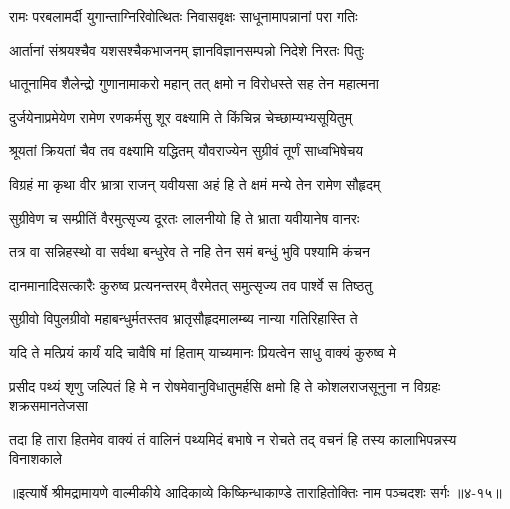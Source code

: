 \twolineshloka
{रामः परबलामर्दी युगान्ताग्निरिवोत्थितः}
{निवासवृक्षः साधूनामापन्नानां परा गतिः} %

\twolineshloka
{आर्तानां संश्रयश्चैव यशसश्चैकभाजनम्}
{ज्ञानविज्ञानसम्पन्नो निदेशे निरतः पितुः} %

\twolineshloka
{धातूनामिव शैलेन्द्रो गुणानामाकरो महान्}
{तत् क्षमो न विरोधस्ते सह तेन महात्मना} %

\twolineshloka
{दुर्जयेनाप्रमेयेण रामेण रणकर्मसु}
{शूर वक्ष्यामि ते किंचिन्न चेच्छाम्यभ्यसूयितुम्} %

\twolineshloka
{श्रूयतां क्रियतां चैव तव वक्ष्यामि यद्धितम्}
{यौवराज्येन सुग्रीवं तूर्णं साध्वभिषेचय} %

\twolineshloka
{विग्रहं मा कृथा वीर भ्रात्रा राजन् यवीयसा}
{अहं हि ते क्षमं मन्ये तेन रामेण सौहृदम्} %

\twolineshloka
{सुग्रीवेण च सम्प्रीतिं वैरमुत्सृज्य दूरतः}
{लालनीयो हि ते भ्राता यवीयानेष वानरः} %

\twolineshloka
{तत्र वा सन्निहस्थो वा सर्वथा बन्धुरेव ते}
{नहि तेन समं बन्धुं भुवि पश्यामि कंचन} %

\twolineshloka
{दानमानादिसत्कारैः कुरुष्व प्रत्यनन्तरम्}
{वैरमेतत् समुत्सृज्य तव पार्श्वे स तिष्ठतु} %

\twolineshloka
{सुग्रीवो विपुलग्रीवो महाबन्धुर्मतस्तव}
{भ्रातृसौहृदमालम्ब्य नान्या गतिरिहास्ति ते} %

\twolineshloka
{यदि ते मत्प्रियं कार्यं यदि चावैषि मां हिताम्}
{याच्यमानः प्रियत्वेन साधु वाक्यं कुरुष्व मे} %

\twolineshloka
{प्रसीद पथ्यं शृणु जल्पितं हि मे न रोषमेवानुविधातुमर्हसि}
{क्षमो हि ते कोशलराजसूनुना न विग्रहः शक्रसमानतेजसा} %

\twolineshloka
{तदा हि तारा हितमेव वाक्यं तं वालिनं पथ्यमिदं बभाषे}
{न रोचते तद् वचनं हि तस्य कालाभिपन्नस्य विनाशकाले} %


॥इत्यार्षे श्रीमद्रामायणे वाल्मीकीये आदिकाव्ये किष्किन्धाकाण्डे ताराहितोक्तिः नाम पञ्चदशः सर्गः ॥४-१५॥
